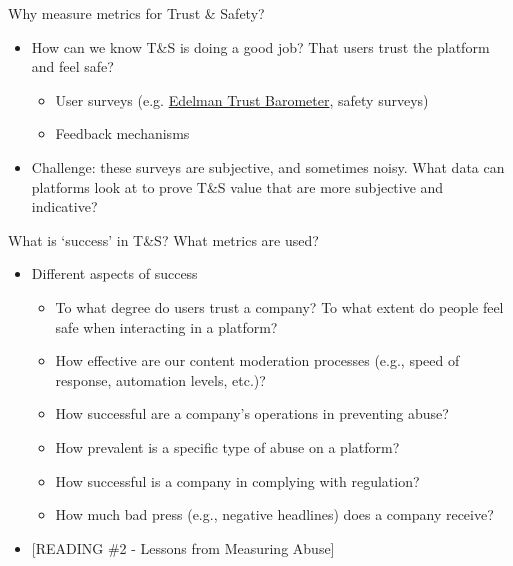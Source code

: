 \documentclass[nobackground,dvipsnames,table]{beamer}
\begin{document}
\begin{frame}{Why measure metrics for Trust \& Safety?}
\begin{itemize}

    \item How can we know T\&S is doing a good job? That users trust the platform and feel safe?

    \begin{itemize}
        \item User surveys (e.g. \href{https://www.edelman.com/trust/2023/trust-barometer}{Edelman Trust Barometer}, safety surveys)
        \item Feedback mechanisms
    \end{itemize}

    \item Challenge: these surveys are subjective, and sometimes noisy. What data can platforms look at to prove T\&S value that are more subjective and indicative?

\end{itemize}

\end{frame}

\begin{frame}{What is ‘success’ in T\&S? What metrics are used?}

\begin{itemize}
    \item Different aspects of success

    \begin{itemize}
        \item To what degree do users trust a company? To what extent do people feel safe when interacting in a platform?
        \item How effective are our content moderation processes (e.g., speed of response, automation levels, etc.)?
        \item How successful are a company’s operations in preventing abuse?
        \item How prevalent is a specific type of abuse on a platform?
        \item How successful is a company in complying with regulation?
        \item How much bad press (e.g., negative headlines) does a company receive?
    \end{itemize}
    \item {[READING \#2 - Lessons from Measuring Abuse]}
\end{itemize}

\end{frame}
\end{document}
